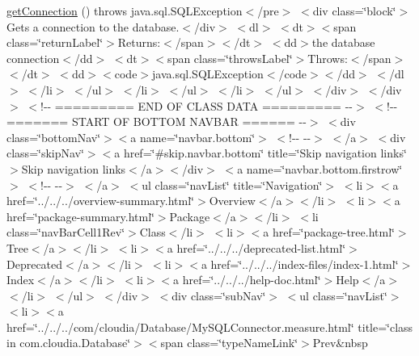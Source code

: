 \begin{DoxyCompactItemize}
\hyperlink{_simple_data_source_8html_ab7a0a080d0e721c656eef11cd641638b}{get\-Connection} ()  throws java.\-sql.\-S\-Q\-L\-Exception$<$/pre$>$ $<$div class=\char`\"{}block\char`\"{}$>$\-Gets a connection to the database.$<$/div$>$ $<$dl$>$ $<$dt$>$$<$span class=\char`\"{}return\-Label\char`\"{}$>$\-Returns\-:$<$/span$>$$<$/dt$>$ $<$dd$>$the database connection$<$/dd$>$ $<$dt$>$$<$span class=\char`\"{}throws\-Label\char`\"{}$>$\-Throws\-:$<$/span$>$$<$/dt$>$ $<$dd$>$$<$code$>$java.\-sql.\-S\-Q\-L\-Exception$<$/code$>$$<$/dd$>$ $<$/dl$>$ $<$/li$>$ $<$/ul$>$ $<$/li$>$ $<$/ul$>$ $<$/li$>$ $<$/ul$>$ $<$/div$>$ $<$/div$>$ $<$!-\/-\/ ========= E\-N\-D O\-F C\-L\-A\-S\-S D\-A\-T\-A ========= -\/-\/$>$ $<$!-\/-\/ ======= S\-T\-A\-R\-T O\-F B\-O\-T\-T\-O\-M N\-A\-V\-B\-A\-R ====== -\/-\/$>$ $<$div class=\char`\"{}bottom\-Nav\char`\"{}$>$$<$a name=\char`\"{}navbar.\-bottom\char`\"{}$>$ $<$!-\/-\/   -\/-\/$>$ $<$/a$>$ $<$div class=\char`\"{}skip\-Nav\char`\"{}$>$$<$a href=\char`\"{}\#skip.\-navbar.\-bottom\char`\"{} title=\char`\"{}\-Skip navigation links\char`\"{}$>$\-Skip navigation links$<$/a$>$$<$/div$>$ $<$a name=\char`\"{}navbar.\-bottom.\-firstrow\char`\"{}$>$ $<$!-\/-\/   -\/-\/$>$ $<$/a$>$ $<$ul class=\char`\"{}nav\-List\char`\"{} title=\char`\"{}\-Navigation\char`\"{}$>$ $<$li$>$$<$a href=\char`\"{}../../../overview-\/summary.\-html\char`\"{}$>$\-Overview$<$/a$>$$<$/li$>$ $<$li$>$$<$a href=\char`\"{}package-\/summary.\-html\char`\"{}$>$\-Package$<$/a$>$$<$/li$>$ $<$li class=\char`\"{}nav\-Bar\-Cell1\-Rev\char`\"{}$>$\-Class$<$/li$>$ $<$li$>$$<$a href=\char`\"{}package-\/tree.\-html\char`\"{}$>$\-Tree$<$/a$>$$<$/li$>$ $<$li$>$$<$a href=\char`\"{}../../../deprecated-\/list.\-html\char`\"{}$>$\-Deprecated$<$/a$>$$<$/li$>$ $<$li$>$$<$a href=\char`\"{}../../../index-\/files/index-\/1.\-html\char`\"{}$>$\-Index$<$/a$>$$<$/li$>$ $<$li$>$$<$a href=\char`\"{}../../../help-\/doc.\-html\char`\"{}$>$\-Help$<$/a$>$$<$/li$>$ $<$/ul$>$ $<$/div$>$ $<$div class=\char`\"{}sub\-Nav\char`\"{}$>$ $<$ul class=\char`\"{}nav\-List\char`\"{}$>$ $<$li$>$$<$a href=\char`\"{}../../../com/cloudia/\-Database/\-My\-S\-Q\-L\-Connector.\-measure.\-html\char`\"{} title=\char`\"{}class in com.\-cloudia.\-Database\char`\"{}$>$$<$span class=\char`\"{}type\-Name\-Link\char`\"{}$>$\-Prev\&nbsp
\end{DoxyCompactItemize}
